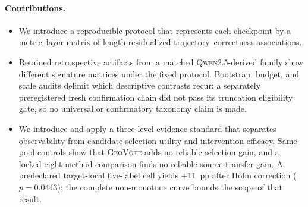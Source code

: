 \paragraph{Contributions.}
\begin{itemize}[topsep=2pt,itemsep=2pt,leftmargin=*]
\item We introduce a reproducible protocol that represents each checkpoint by
a metric--layer matrix of length-residualized trajectory--correctness
associations.
\item Retained retrospective artifacts from a matched
\textsc{Qwen2.5}-derived family show different signature matrices under the
fixed protocol.  Bootstrap, budget, and scale audits delimit which descriptive
contrasts recur; a separately preregistered fresh confirmation chain did not
pass its truncation eligibility gate, so no universal or confirmatory
taxonomy claim is made.
\item We introduce and apply a three-level evidence standard that separates
observability from candidate-selection utility and intervention efficacy.
Same-pool controls show that \textsc{GeoVote} adds no reliable selection gain,
and a locked eight-method comparison finds no reliable source-transfer gain.  A
predeclared target-local five-label cell yields $+11$~pp after Holm correction ($p{=}0.0443$);
the complete non-monotone curve bounds the scope of that result.
\end{itemize}

